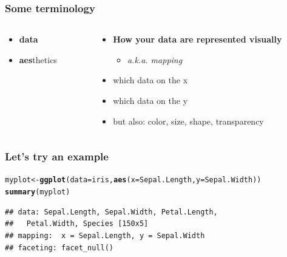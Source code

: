 \documentclass{beamer}\usepackage[]{graphicx}\usepackage[]{color}
\makeatletter
\newcommand{\hlstd}[1]{\textcolor[rgb]{0.345,0.345,0.345}{#1}}%
\newcommand{\hlkwb}[1]{\textcolor[rgb]{0.69,0.353,0.396}{#1}}%
\newcommand{\hlkwc}[1]{\textcolor[rgb]{0.333,0.667,0.333}{#1}}%
\newcommand{\hlkwd}[1]{\textcolor[rgb]{0.737,0.353,0.396}{\textbf{#1}}}%
\newenvironment{kframe}{%
 \def\at@end@of@kframe{}%
 \ifinner\ifhmode%
  \def\at@end@of@kframe{\end{minipage}}%
  \begin{minipage}{\columnwidth}%
 \fi\fi%
 \def\FrameCommand##1{\hskip\@totalleftmargin \hskip-\fboxsep
 \colorbox{shadecolor}{##1}\hskip-\fboxsep
     \hskip-\linewidth \hskip-\@totalleftmargin \hskip\columnwidth}%
 \MakeFramed {\advance\hsize-\width
   \@totalleftmargin\z@ \linewidth\hsize
   \@setminipage}}%
 {\par\unskip\endMakeFramed%
 \at@end@of@kframe}
\newenvironment{knitrout}{}{} %
\makeatother
\begin{document}
\begin{frame}[fragile]
\frametitle{Some terminology}
\begin{columns}[t]

\begin{column}[T]{3cm}
\begin{itemize}
    \item \textbf{\color{gray}data}
    \item \textbf{aes}thetics
\end{itemize}
\end{column}

\begin{column}[T]{8cm}
\begin{itemize}
    \item \textbf{How your data are represented visually}
        \begin{itemize}
        \item \emph{a.k.a. mapping}
        \end{itemize}
    \item which data on the x
    \item which data on the y
    \item but also: {\color{red}color}, {\LARGE{size}}, shape, transparency
\end{itemize}
\end{column}

\end{columns}
\end{frame}


\begin{frame}[fragile]
\frametitle{Let's try an example}
\begin{knitrout}\footnotesize
{}\color{fgcolor}\begin{kframe}
\begin{alltt}
\hlstd{myplot} \hlkwb{<-} \hlkwd{ggplot}\hlstd{(}\hlkwc{data} \hlstd{= iris,} \hlkwd{aes}\hlstd{(}\hlkwc{x} \hlstd{= Sepal.Length,} \hlkwc{y} \hlstd{= Sepal.Width))}
\hlkwd{summary}\hlstd{(myplot)}
\end{alltt}
\begin{verbatim}
## data: Sepal.Length, Sepal.Width, Petal.Length,
##   Petal.Width, Species [150x5]
## mapping:  x = Sepal.Length, y = Sepal.Width
## faceting: facet_null()
\end{verbatim}
\end{kframe}
\end{knitrout}
\end{frame}
\end{document}
